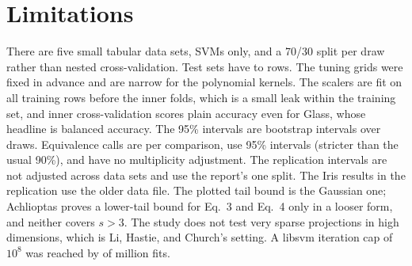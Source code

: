 \section{Limitations}

There are five small tabular data sets, SVMs only, and a 70/30 split per draw rather than nested cross-validation. Test sets have  to  rows. The tuning grids were fixed in advance and are narrow for the polynomial kernels. The scalers are fit on all training rows before the inner folds, which is a small leak within the training set, and inner cross-validation scores plain accuracy even for Glass, whose headline is balanced accuracy. The 95\% intervals are bootstrap intervals over draws. Equivalence calls are per comparison, use 95\% intervals (stricter than the usual 90\%), and have no multiplicity adjustment. The replication intervals are not adjusted across data sets and use the report's one split. The Iris results in the replication use the older data file. The plotted tail bound is the Gaussian one; Achlioptas proves a lower-tail bound for Eq.~3 and Eq.~4 only in a looser form, and neither covers $s > 3$. The study does not test very sparse projections in high dimensions, which is Li, Hastie, and Church's setting. A libsvm iteration cap of $10^8$ was reached by  of  million fits.
